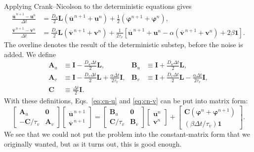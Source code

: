 Applying Crank--Nicolson to the deterministic equations gives
\begin{align}
  \frac{\overline{\boldsymbol u}^{\,n+1}-\boldsymbol u^n}{\Delta t}
    &=
      \frac{D_u}{2}\mathbf L
      \left(\overline{\boldsymbol u}^{\,n+1}+\boldsymbol u^n\right)
      +\frac{1}{2}
      \left(\boldsymbol\varphi^{n+1}
      +\boldsymbol\varphi^n\right),
      \label{eq:cn-u}\\
  \frac{\overline{\boldsymbol v}^{\,n+1}-\boldsymbol v^n}{\Delta t}
    &=
      \frac{D_v}{2}\mathbf L
      \left(\overline{\boldsymbol v}^{\,n+1}+\boldsymbol v^n\right)
      +\frac{1}{2\tau_v}
      \left[
        \overline{\boldsymbol u}^{\,n+1}+\boldsymbol u^n
        -\alpha\left(
          \overline{\boldsymbol v}^{\,n+1}+\boldsymbol v^n
        \right)
        +2\beta\boldsymbol 1
      \right].
      \label{eq:cn-v}
\end{align}
The overline denotes the result of the deterministic substep, before the
noise is added.  We define
\begin{align}
  \mathbf A_u
    &\equiv \mathbf I-\frac{D_u\Delta t}{2}\mathbf L,
  &\mathbf B_u
    &\equiv \mathbf I+\frac{D_u\Delta t}{2}\mathbf L,
    \label{eq:uv-matrices-u}\\
  \mathbf A_v
    &\equiv \mathbf I-\frac{D_v\Delta t}{2}\mathbf L
      +\frac{\alpha\Delta t}{2\tau_v}\mathbf I,
  &\mathbf B_v
    &\equiv \mathbf I+\frac{D_v\Delta t}{2}\mathbf L
      -\frac{\alpha\Delta t}{2\tau_v}\mathbf I,
    \label{eq:uv-matrices-v}\\
  \mathbf C
    &\equiv \frac{\Delta t}{2}\mathbf I.
  &&
  \label{eq:c-matrix}
\end{align}
With these definitions, Eqs.~\eqref{eq:cn-u} and \eqref{eq:cn-v} can be
put into matrix form:
\begin{equation}
  \begin{bmatrix}
    \mathbf A_u & \mathbf 0\\
    -\mathbf C/\tau_v & \mathbf A_v
  \end{bmatrix}
  \begin{bmatrix}
    \overline{\boldsymbol u}^{\,n+1}\\
    \overline{\boldsymbol v}^{\,n+1}
  \end{bmatrix}
  =
  \begin{bmatrix}
    \mathbf B_u & \mathbf 0\\
    \mathbf C/\tau_v & \mathbf B_v
  \end{bmatrix}
  \begin{bmatrix}
    \boldsymbol u^n\\
    \boldsymbol v^n
  \end{bmatrix}
  +
  \begin{bmatrix}
    \mathbf C\left(
      \boldsymbol\varphi^n+\boldsymbol\varphi^{n+1}
    \right)\\
    (\beta\Delta t/\tau_v)\boldsymbol 1
  \end{bmatrix}.
  \label{eq:block-system}
\end{equation}
We see that we could not put the problem into the constant-matrix form
that we originally wanted, but as it turns out, this is good enough.

